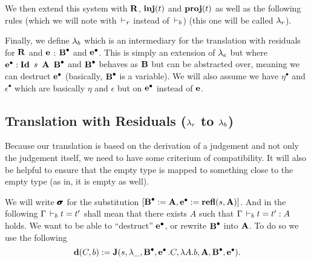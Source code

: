 \documentclass[a4paper,english]{lipics-utf8x}
\begin{document}
  We then extend this system with $\mR$, $\inj(t)$ and $\proj(t)$ as well as
  the following rules (which we will note with $\derr$ instead of $\derb$)
  (this one will be called $\Sr$).

  \begin{mathc}
    \ru{\derr \Gamma
      }{\Gamma \derr \mR : \sB}
    \qquad
    \qquad
  \end{mathc}

  \begin{mathc}
    \qquad
  \end{mathc}

  Finally, we define $\Sb$ which is an intermediary for the translation
  with residuals for $\mR$ and $\me$ : $\mbB$ and $\mbe$.
  This is simply an extension of $\Se$ but where
  $\mbe : \Id s\ \mA\ \mbB$ and $\mbB$ behaves as $\mB$ but can be abstracted
  over, meaning we can destruct $\mbe$ (basically, $\mbB$ is a variable).
  We will also assume we have $\eta^\bullet$ and $\epsilon^\bullet$ which are
  basically $\eta$ and $\epsilon$ but on $\mbe$ instead of $\me$.

  \subsection{Translation with Residuals ($\Sr$ to $\Sb$)}

  Because our translation is based on the derivation of a judgement and not
  only the judgement itself, we need to have some criterium of compatibility.
  It will also be helpful to ensure that the empty type is mapped to something
  close to the empty type (as in, it is empty as well).

  We will write $\msigma$ for the substitution
  $[\mbB := \mA, \mbe := \refl(s,\mA)]$.
  And in the following $\Gamma \derb t = t'$ shall mean that there exists $A$
  such that $\Gamma \derb t = t' : A$ holds.
  We want to be able to ``destruct'' $\mbe$, or rewrite $\mbB$ into $\mA$.
  To do so we use the following
  \[
    \de(C,b) := \J(s, \lambda \_, \mbB, \mbe. C, \lambda A. b, \mA, \mbB, \mbe).
  \]
\end{document}
